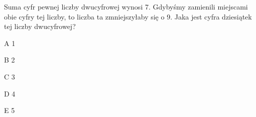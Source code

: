 \begin{tresc}
Suma cyfr pewnej liczby dwucyfrowej wynosi 7. Gdybyśmy zamienili miejscami obie cyfry tej liczby, to liczba ta zmniejszyłaby się o 9. Jaka jest cyfra dziesiątek tej liczby dwucyfrowej?
\end{tresc}
\begin{wariant}{A} 1 \end{wariant}
\begin{wariant}{B} 2 \end{wariant}
\begin{wariant}{C} 3 \end{wariant}
\begin{wariant}{D} 4 \end{wariant}
\begin{wariant}{E} 5 \end{wariant}
